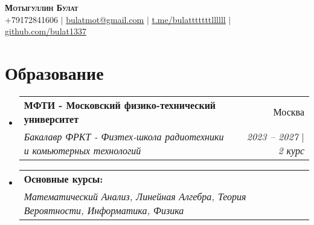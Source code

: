 \documentclass[letterpaper,11pt]{article}
\makeatletter
\newcommand{\resumeSubheading}[4]{
  \vspace{-2pt}\item
    \begin{tabular*}{0.97\textwidth}[t]{l@{\extracolsep{\fill}}r}
      \textbf{#1} & #2 \\
      \textit{\small#3} & \textit{\small #4} \\
    \end{tabular*}\vspace{-7pt}
}
\newcommand{\resumeSubHeadingListStart}{\begin{itemize}[leftmargin=0.15in, label={}]}
\newcommand{\resumeSubHeadingListEnd}{\end{itemize}}
\makeatother
\begin{document}

\begin{center}
    \textbf{\Huge \scshape Мотыгуллин Булат} \\ \vspace{1pt}
    \small +79172841606 $|$ \href{bulatmot@gmail.com}{\underline{bulatmot@gmail.com}} $|$ 
    \href{https://t.me/bulatttttttllllll}{\underline{t.me/bulatttttttllllll}} $|$
    \href{https://github.com/bulat1337}{\underline{github.com/bulat1337}}
\end{center}


\section{Образование}
\resumeSubHeadingListStart
  \resumeSubheading
    {МФТИ - Московский физико-технический университет}{Москва}
    {Бакалавр ФРКТ - Физтех-школа радиотехники и комьютерных технологий}{2023 -- 2027 $|$ 2 курс}
\resumeSubHeadingListEnd

\vspace*{-3mm} %

\resumeSubHeadingListStart
  \resumeSubheading
    {Основные курсы:}{}
    {Математический Анализ, Линейная Алгебра, Теория Вероятности, Информатика, Физика}{}
\resumeSubHeadingListEnd

\end{document}

